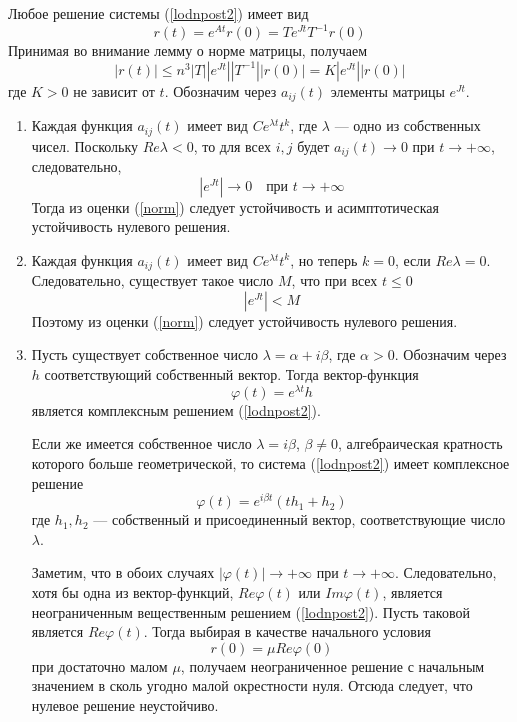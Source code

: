 \documentclass{article}
\begin{document}
Любое решение системы (\ref{lodnpost2}) имеет вид
\begin{equation*}
    r(t) = e^{At}r(0) = Te^{Jt}T^{-1}r(0)
\end{equation*}
Принимая во внимание лемму о норме матрицы, получаем
\begin{equation}
    |r(t)| \le n^3 |T||e^{Jt}||T^{-1}||r(0)| = K |e^{Jt}||r(0)| \label{norm}
\end{equation}
где $K > 0$ не зависит от $t$. Обозначим через $a_{ij}(t)$ элементы матрицы $e^{Jt}$.
\begin{enumerate}
    \item Каждая функция $a_{ij}(t)$ имеет вид $Ce^{\lambda t}t^k$, где $\lambda$ --- одно из собственных чисел. Поскольку $Re \lambda < 0$, то для всех $i, j$ будет $a_{ij}(t) \to 0$ при $t \to +\infty$, следовательно,
    \begin{equation*}
        |e^{Jt}| \to 0 \quad \text{при } t \to +\infty
    \end{equation*}
    Тогда из оценки (\ref{norm}) следует устойчивость и асимптотическая устойчивость нулевого решения.
    \item Каждая функция $a_{ij}(t)$ имеет вид $Ce^{\lambda t}t^k$, но теперь $k = 0$, если $Re \lambda = 0$. Следовательно, существует такое число $M$, что при всех $t \le 0$
    \begin{equation*}
        |e^{Jt}| < M
    \end{equation*}
    Поэтому из оценки (\ref{norm}) следует устойчивость нулевого решения.
    \item Пусть существует собственное число $\lambda = \alpha + i\beta$, где $\alpha > 0$. Обозначим через $h$ соответствующий собственный вектор. Тогда вектор-функция
    \begin{equation*}
        \varphi(t) = e^{\lambda t}h
    \end{equation*}
    является комплексным решением (\ref{lodnpost2}).
    
    Если же имеется собственное число $\lambda = i\beta$, $\beta \neq 0$, алгебраическая кратность которого больше геометрической, то система (\ref{lodnpost2}) имеет комплексное решение
    \begin{equation*}
        \varphi(t) = e^{i\beta t}(th_1 + h_2)
    \end{equation*}
    где $h_1, h_2$ --- собственный и присоединенный вектор, соответствующие число $\lambda$.
    
    Заметим, что в обоих случаях $|\varphi(t)| \to +\infty$ при $t \to +\infty$. Следовательно, хотя бы одна из вектор-функций, $Re\varphi(t)$ или $Im\varphi(t)$, является неограниченным вещественным решением (\ref{lodnpost2}). Пусть таковой является $Re\varphi(t)$. Тогда выбирая в качестве начального условия
    \begin{equation*}
        r(0) = \mu Re\varphi(0)
    \end{equation*}
    при достаточно малом $\mu$, получаем неограниченное решение с начальным значением в сколь угодно малой окрестности нуля. Отсюда следует, что нулевое решение неустойчиво.
\end{enumerate}
\end{document}
